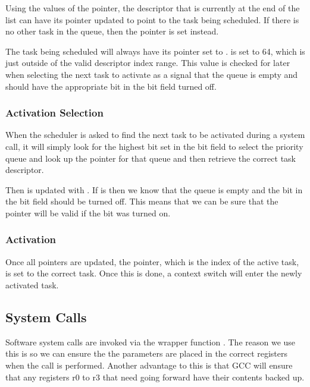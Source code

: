 \documentclass[pdftex,10pt,a4paper]{article}
\begin{document}
Using the values of the  pointer, the descriptor that is
currently at the end of the list can have its  pointer
updated to point to the task being scheduled. If there is no other
task in the queue, then the  pointer is set instead.

The task being scheduled will always have its  pointer set
to .  is set to 64, which is just
outside of the valid descriptor index range. This value is checked for
later when selecting the next task to activate as a signal that the
queue is empty and should have the appropriate bit in the bit field
turned off.

\subsubsection*{Activation Selection}

When the scheduler is asked to find the next task to be activated
during a system call, it will simply look for the highest bit set in
the bit field to select the priority queue and look up the 
pointer for that queue and then retrieve the correct task descriptor.

Then  is updated with . If 
is  then we know that the queue is empty and the bit
in the bit field should be turned off. This means that we can be sure
that the  pointer will be valid if the bit was turned on.

\subsubsection*{Activation}

Once all pointers are updated, the  pointer, which
is the index of the active task, is set to the correct task. Once this
is done, a context switch will enter the newly activated task.

\subsection*{System Calls}

Software system calls are invoked via the wrapper function .
The reason we use this is so we can ensure the the parameters are placed in the
correct registers when the  call is performed. Another advantage to this
is that GCC will ensure that any registers r0 to r3 that need going
forward have their contents backed up.
\end{document}
